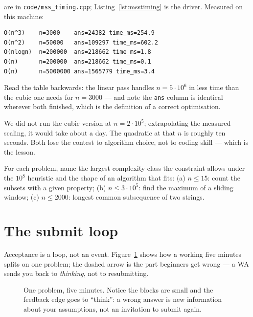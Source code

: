 \begin{example}
\begin{solution}
are in \texttt{code/mss\_timing.cpp}; Listing~\ref{lst:msstiming} is the
driver. Measured on this machine:
\begin{lstlisting}[numbers=none]
O(n^3)    n=3000    ans=24382 time_ms=254.9
O(n^2)    n=50000   ans=109297 time_ms=602.2
O(nlogn)  n=200000  ans=218662 time_ms=1.8
O(n)      n=200000  ans=218662 time_ms=0.1
O(n)      n=5000000 ans=1565779 time_ms=3.4
\end{lstlisting}
Read the table backwards: the linear pass handles $n=5\cdot10^6$ in less
time than the cubic one needs for $n=3000$ --- and note the \texttt{ans}
column is identical wherever both finished, which is the definition of a
correct optimisation.
\end{solution}
\end{example}



We did not run the cubic version at $n=2\cdot10^5$; extrapolating the
measured scaling, it would take about a day. The quadratic at that $n$ is
roughly ten seconds. Both lose the contest to algorithm choice, not to
coding skill --- which is the lesson.

\begin{exercise}[medium]\label{exr:pickclass}
For each problem, name the largest complexity class the constraint allows
under the $10^8$ heuristic and the shape of an algorithm that fits:
(a) $n \le 15$: count the subsets with a given property;
(b) $n \le 3\cdot10^5$: find the maximum of a sliding window;
(c) $n \le 2000$: longest common subsequence of two strings.
\end{exercise}

\section{The submit loop}\label{sec:submit}

Acceptance is a loop, not an event. Figure~\ref{fig:minute} shows how a
working five minutes splits on one problem; the dashed arrow is the part
beginners get wrong --- a WA sends you back to \emph{thinking}, not to
resubmitting.

\begin{figure}[ht]\centering

\caption{One problem, five minutes. Notice the blocks are small and the
feedback edge goes to ``think'': a wrong answer is new information about
your assumptions, not an invitation to submit again.}
\label{fig:minute}
\end{figure}

